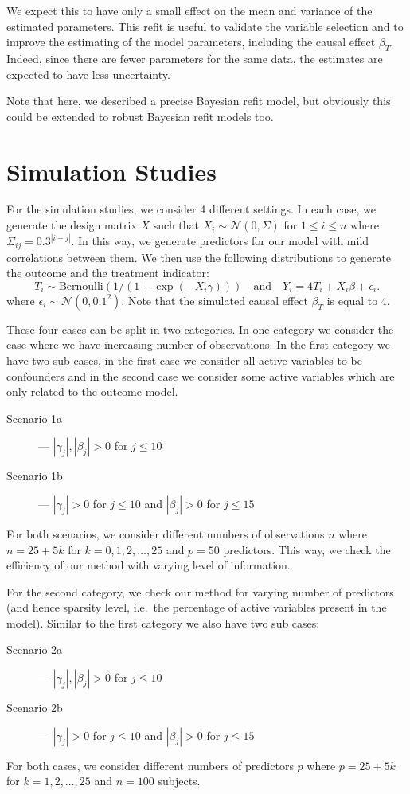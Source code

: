 \documentclass[preprint,12pt]{elsarticle}
\begin{document}
We expect this to have only a small effect on the mean and variance of the estimated parameters. This refit is useful to validate the variable selection and to improve the estimating of the model parameters, including the causal effect $\beta_T$. Indeed, since there are fewer parameters for the same data, the estimates are expected to have less uncertainty.

Note that here, we described a precise Bayesian refit model, but obviously this could be extended to robust Bayesian refit models too.

\section{Simulation Studies}\label{sec:sim}

For the simulation studies, we consider 4 different settings. In each
case, we generate the design matrix $X$ such that $X_i\sim\mathcal{N}(0, \Sigma)$
for $1\le i\le n$ where $\Sigma_{ij} = 0.3^{|i-j|}$. In this way, we 
generate predictors for our model with mild correlations between them.
We then use the following distributions to generate the outcome and
the treatment indicator: 
\begin{equation}
    T_i \sim \text{Bernoulli}\left(1/(1+\exp(-X_i\gamma))\right)
    \quad\text{and}\quad
    Y_i = 4T_i + X_i\beta + \epsilon_i.
\end{equation}
where $\epsilon_i\sim\mathcal{N}(0,0.1^2)$.
Note that the simulated causal effect $\beta_T$ is equal to $4$.

These four cases can be split in two categories. In one category we consider the
case where we have increasing number of observations. In the first category we have two
sub cases, in the first case we consider all active variables to be confounders
and in the second case we consider some active variables which are only related to
the outcome model. 
\begin{description}
    \item[Scenario 1a] --- $|\gamma_j|, |\beta_j|>0$ for $j\le 10$
    \item[Scenario 1b] --- $|\gamma_j|>0$ for $j\le 10$ and $|\beta_j|>0$ for $j\le 15$
\end{description}
For both
scenarios, we consider different numbers of observations $n$ where
$n=25+ 5k$ for $k=0,1,2,\dots,25$ and $p=50$
predictors. This way, we check the efficiency of our method with varying level of information.

For the second category, we check our method for varying number of predictors 
(and hence sparsity level, i.e.\ the percentage of active variables present in the model).
Similar to the first category we also have two sub cases:
\begin{description}
    \item[Scenario 2a] --- $|\gamma_j|, |\beta_j|>0$ for $j\le 10$
    \item[Scenario 2b] --- $|\gamma_j|>0$ for $j\le 10$ and $|\beta_j|>0$ for $j\le 15$
\end{description}
For both
cases, we consider different numbers of predictors $p$ where
$p=25+ 5k$ for $k=1,2,\dots,25$ and $n=100$
subjects.
\end{document}
